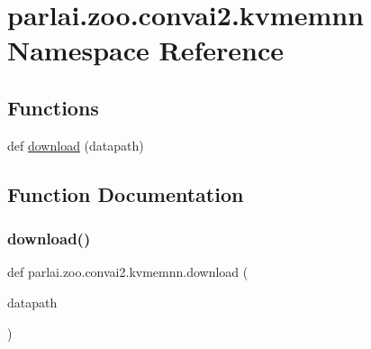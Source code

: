 \hypertarget{namespaceparlai_1_1zoo_1_1convai2_1_1kvmemnn}{}\section{parlai.\+zoo.\+convai2.\+kvmemnn Namespace Reference}
\label{namespaceparlai_1_1zoo_1_1convai2_1_1kvmemnn}
\subsection*{Functions}
\begin{DoxyCompactItemize}
\item 
def \hyperlink{namespaceparlai_1_1zoo_1_1convai2_1_1kvmemnn_a984032582e81c6a3d609f8a72dfb616e}{download} (datapath)
\end{DoxyCompactItemize}


\subsection{Function Documentation}
\mbox{\label{namespaceparlai_1_1zoo_1_1convai2_1_1kvmemnn_a984032582e81c6a3d609f8a72dfb616e}} 
\subsubsection{\texorpdfstring{download()}{download()}}
{\footnotesize\ttfamily def parlai.\+zoo.\+convai2.\+kvmemnn.\+download (\begin{DoxyParamCaption}\item[{}]{datapath }\end{DoxyParamCaption})}

